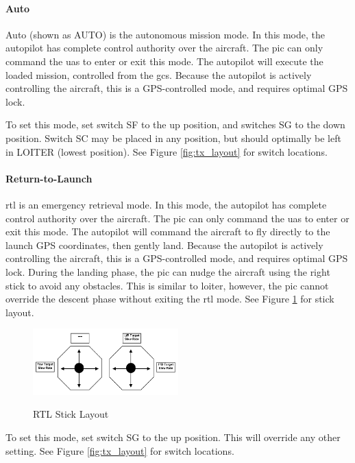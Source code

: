 \documentclass{report}
\begin{document}
				\paragraph{Auto}
					Auto (shown as AUTO) is the autonomous mission mode.  In this mode, the autopilot has complete control authority over the aircraft.  The \gls{pic} can only command the \gls{uas} to enter or exit this mode.  The autopilot will execute the loaded mission, controlled from the \gls{gcs}.  Because the autopilot is actively controlling the aircraft, this is a GPS-controlled mode, and requires optimal GPS lock.

					To set this mode, set switch SF to the up position, and switches SG to the down position.  Switch SC may be placed in any position, but should optimally be left in LOITER (lowest position).  See Figure \ref{fig:tx_layout} for switch locations.
				\paragraph{Return-to-Launch}
					\gls{rtl} is an emergency retrieval mode.  In this mode, the autopilot has complete control authority over the aircraft.  The \gls{pic} can only command the \gls{uas} to enter or exit this mode.  The autopilot will command the aircraft to fly directly to the launch GPS coordinates, then gently land.  Because the autopilot is actively controlling the aircraft, this is a GPS-controlled mode, and requires optimal GPS lock.  During the landing phase, the \gls{pic} can nudge the aircraft using the right stick to avoid any obstacles.  This is similar to loiter, however, the \gls{pic} cannot override the descent phase without exiting the \gls{rtl} mode.  See Figure \ref{fig:rtl_sticks} for stick layout.

					\begin{figure}[ht]
						\centering
						\caption{RTL Stick Layout}
						\includegraphics[width=0.5\textwidth]{rtl_stick_layout.png}
						\label{fig:rtl_sticks}
					\end{figure}

					To set this mode, set switch SG to the up position.  This will override any other setting.  See Figure \ref{fig:tx_layout} for switch locations.
\end{document}

